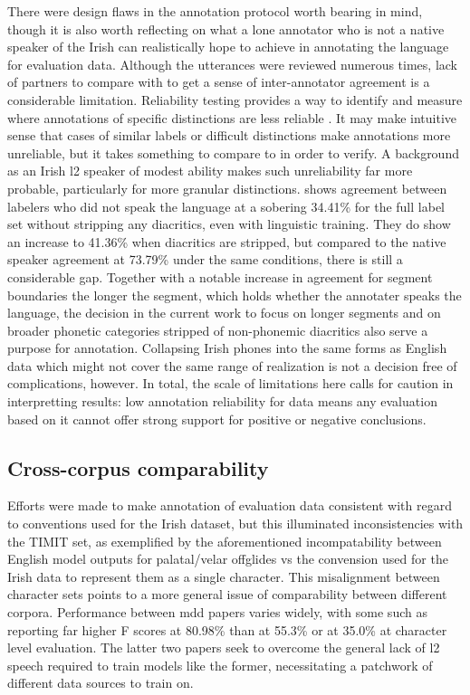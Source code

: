 \documentclass[thesis]{cluu}
\begin{document}
There were design flaws in the annotation protocol worth bearing in mind, though it is also worth reflecting on what a lone annotator who is not a native speaker of the Irish can realistically hope to achieve in annotating the language for evaluation data. Although the utterances were reviewed numerous times, lack of partners to compare with to get a sense of inter-annotator agreement is a considerable limitation. Reliability testing provides a way to identify and measure where annotations of specific distinctions are less reliable \parencite{artsteinInterannotatorAgreement2017}. It may make intuitive sense that cases of similar labels or difficult distinctions make annotations more unreliable, but it takes something to compare to in order to verify. A background as an Irish \gls{l2} speaker of modest ability makes such unreliability far more probable, particularly for more granular distinctions. \textcite{coleLabelerAgreementPhonetic1994} shows agreement between labelers who did not speak the language at a sobering 34.41\% for the full label set without stripping any diacritics, even with linguistic training. They do show an increase to 41.36\% when diacritics are stripped, but compared to the native speaker agreement at 73.79\% under the same conditions, there is still a considerable gap. Together with a notable increase in agreement for segment boundaries the longer the segment, which holds whether the annotater speaks the language, the decision in the current work to focus on longer segments and on broader phonetic categories stripped of non-phonemic diacritics also serve a purpose for annotation. Collapsing Irish phones into the same forms as English data which might not cover the same range of realization is not a decision free of complications, however. In total, the scale of limitations here calls for caution in interpretting results: low annotation reliability for data means any evaluation based on it cannot offer strong support for positive or negative conclusions. 
\subsection{Cross-corpus comparability}
Efforts were made to make annotation of evaluation data consistent with regard to conventions used for the Irish dataset, but this illuminated inconsistencies with the TIMIT set, as exemplified by the aforementioned incompatability between English model outputs for palatal/velar offglides vs the convension used for the Irish data to represent them as a single character. This misalignment between character sets points to a more general issue of comparability between different corpora. Performance between \gls{mdd} papers varies widely, with some such as \textcite{wuTransformerBasedEndtoEnd2021} reporting far higher F scores at 80.98\% than \textcite{zhangL2GENNeuralPhoneme2022} at 55.3\% or \textcite{phanMispronunciationDetectionL22025} at 35.0\% at character level evaluation. The latter two papers seek to overcome the general lack of \gls{l2} speech required to train models like the former, necessitating a patchwork of different data sources to train on. 
\end{document}
